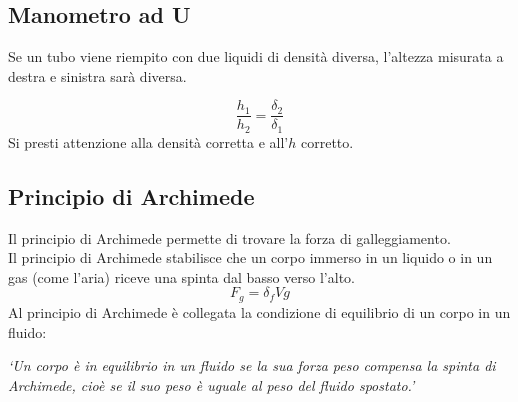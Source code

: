   \subsection{Manometro ad U}
  Se un tubo viene riempito con due liquidi di densità diversa, l'altezza misurata a destra e 
  sinistra sarà diversa.
  \begin{center}
  \end{center}
  \begin{equation*}
    \frac{h_1}{h_2} = \frac{\delta_2}{\delta_1}
  \end{equation*}
  Si presti attenzione alla densità corretta e all'$h$ corretto.

  \subsection{Principio di Archimede}
  Il principio di Archimede permette di trovare la forza di galleggiamento.\\
  Il principio di Archimede stabilisce che un corpo immerso in un liquido o in un gas (come l'aria) 
  riceve una spinta dal basso verso l'alto.
  \begin{equation*}
    F_g = \delta_fVg
  \end{equation*}
  Al principio di Archimede è collegata la condizione di equilibrio di un corpo in un fluido:\\
  \begin{center}
    \emph{`Un corpo è in equilibrio in un fluido se la sua forza peso compensa la spinta di 
    Archimede, cioè se il suo peso è uguale al peso del fluido spostato.'}
  \end{center}

